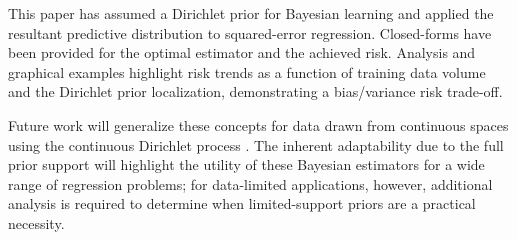 \documentclass{article}
\begin{document}
This paper has assumed a Dirichlet prior for Bayesian learning and applied the resultant predictive distribution to squared-error regression. Closed-forms have been provided for the optimal estimator and the achieved risk. Analysis and graphical examples highlight risk trends as a function of training data volume and the Dirichlet prior localization, demonstrating a bias/variance risk trade-off.

Future work will generalize these concepts for data drawn from continuous spaces using the continuous Dirichlet process \cite{gershman}. The inherent adaptability due to the full prior support will highlight the utility of these Bayesian estimators for a wide range of regression problems; for data-limited applications, however, additional analysis is required to determine when limited-support priors are a practical necessity.






\end{document}

